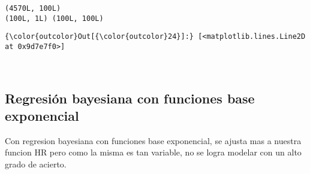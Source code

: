 \documentclass[11pt]{article}
\begin{document}
    \begin{Verbatim}[commandchars=\\\{\}]
(4570L, 100L)
(100L, 1L) (100L, 100L)

    \end{Verbatim}

\begin{Verbatim}[commandchars=\\\{\}]
{\color{outcolor}Out[{\color{outcolor}24}]:} [<matplotlib.lines.Line2D at 0x9d7e7f0>]
\end{Verbatim}
            
    \begin{center}
    \end{center}
    { \hspace*{\fill} \\}
    
    \subsection{Regresión bayesiana con funciones base
exponencial}\label{regresiuxf3n-bayesiana-con-funciones-base-exponencial}

    Con regresion bayesiana con funciones base exponencial, se ajusta mas a
nuestra funcion HR pero como la misma es tan variable, no se logra
modelar con un alto grado de acierto.
\end{document}
